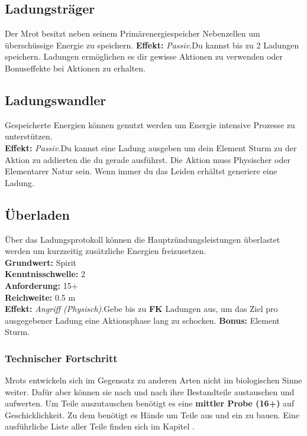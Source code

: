 \subsection*{Ladungsträger} \label{sk:ladungstraeger}
Der Mrot besitzt neben seinem Primärenergiespeicher Nebenzellen um überschüssige Energie zu speichern.
\textbf{Effekt:} \textit{Passiv.}Du kannst bis zu 2 Ladungen speichern. Ladungen ermöglichen es dir gewisse Aktionen zu verwenden oder Bonuseffekte bei Aktionen zu erhalten.

\subsection*{Ladungswandler} \label{sk:ladungswandler}
Gespeicherte Energien können genutzt werden um Energie intensive Prozesse zu unterstützen.\\
\textbf{Effekt:} \textit{Passiv.}Du kannst eine Ladung ausgeben um dein Element Sturm zu der Aktion zu addierten die du gerade ausführst. Die Aktion muss Physischer oder Elementarer Natur sein. Wenn immer du das Leiden  erhältst generiere eine Ladung.

\subsection*{Überladen} \label{sk:ueberladen}
Über das Ladungsprotokoll können die Hauptzündungsleistungen überlastet werden um kurzzeitig zusätzliche Energien freizusetzen.\\
\textbf{Grundwert:} Spirit \\
\textbf{Kenntnisschwelle:} 2 \\
\textbf{Anforderung:} 15+ \\
\textbf{Reichweite:} 0.5 m\\
\textbf{Effekt:} \textit{Angriff (Physisch)}.Gebe bis zu \textbf{FK} Ladungen aus, um das Ziel pro ausgegebener Ladung eine Aktionsphase lang zu schocken. \textbf{Bonus:} Element Sturm.
\subsubsection*{Technischer Fortschritt}
Mrots entwickeln sich im Gegensatz zu anderen Arten nicht im biologischen Sinne weiter. Dafür aber können sie nach und nach ihre Bestandteile austauschen und aufwerten. Um Teile auszutauschen benötigt es eine \textbf{mittler Probe (16+)} auf Geschicklichkeit. Zu dem benötigt es Hände um Teile aus und ein zu bauen. Eine ausführliche Liste aller Teile finden sich im Kapitel \textit{}.


